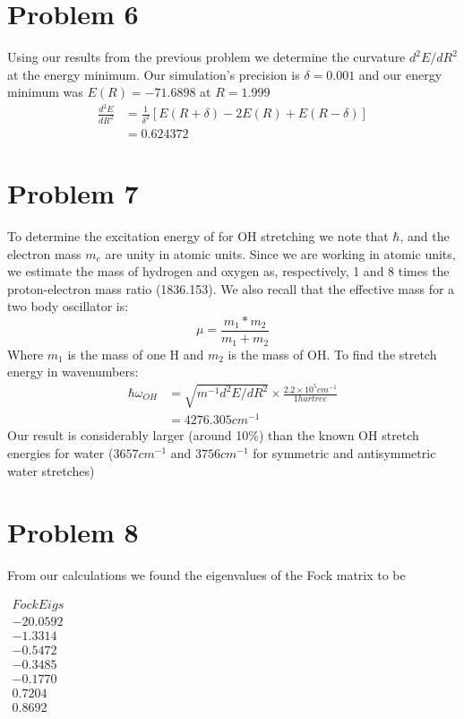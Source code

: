 \documentclass{article}
\begin{document}
\section*{Problem 6}
Using our results from the previous problem we determine the curvature $d^2E/dR^2$ at the energy minimum. Our simulation's precision is $\delta=0.001$ and our energy minimum was $E(R)=-71.6898$ at $R=1.999$
\begin{align}
  \frac{d^2E}{dR^2} &= \frac{1}{\delta^2}[E(R+\delta) -2E(R) + E(R-\delta)]\\
  &= 0.624372
\end{align}


\section*{Problem 7}
To determine the excitation energy of for OH stretching we note that $\hbar$, and the electron mass $m_e$ are unity in atomic units. Since we are working in atomic units, we estimate the mass of hydrogen and oxygen as, respectively, 1 and 8 times the proton-electron mass ratio (1836.153). We also recall that the effective mass for a two body oscillator is:
$$\mu = \frac{m_1*m_2}{m_1+m_2}$$
Where $m_1$ is the mass of one H and $m_2$ is the mass of OH. To find the stretch energy in wavenumbers:
\begin{align}
  \hbar\omega_{OH} &= \sqrt{m^{-1}d^2E/dR^2} \times \frac{2.2\times 10^5 cm^{-1}}{1 hartree}\\
  &= 4276.305 cm^{-1}
\end{align}
Our result is considerably larger (around 10\%) than the known OH stretch energies for water ($3657 cm^{-1}$ and $3756 cm^{-1}$ for symmetric and antisymmetric water stretches)


\section*{Problem 8}
From our calculations we found the eigenvalues of the Fock matrix to be
\begin{center}
  $\begin{array}{c}
    Fock Eigs \\ \hline
    -20.0592 \\
    -1.3314 \\
    -0.5472 \\
    -0.3485 \\
    -0.1770 \\
    0.7204 \\
    0.8692 \\
  \end{array}$
\end{center}
\end{document}
